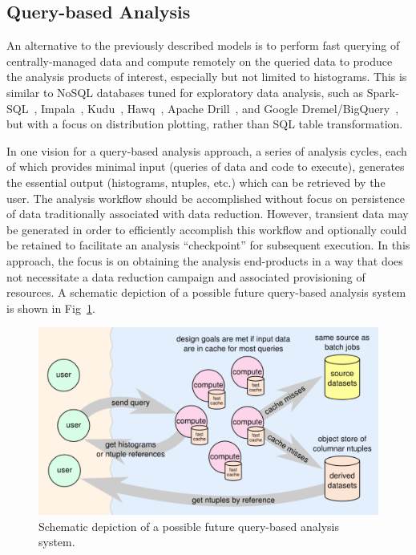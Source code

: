 \documentclass[12pt,a4paper]{article}
\begin{document}
\subsection{Query-based Analysis}

An alternative to the previously described models is to perform fast querying of  centrally-managed data and compute remotely on the queried data to produce the analysis products of interest, especially but not limited to histograms. This is similar to NoSQL databases tuned for exploratory data analysis, such as Spark-SQL~\cite{Armbrust:2015:SSR:2723372.2742797}, Impala~\cite{bittorf2015impala}, Kudu~\cite{t.lipcond.alvesd.burkertj.d.cryansa.dembom.percys.rusd.wangm.bertozzic.p.mccabea.wang.2015}, Hawq~\cite{Chang:2014:HMP:2588555.2595636}, Apache Drill~\cite{drill}, and Google Dremel/BigQuery~\cite{36632}, but with a focus on distribution plotting, rather than SQL table transformation.

In one vision for a query-based analysis approach, a series of analysis cycles, each of which provides minimal input (queries of data and code to execute), generates the essential output (histograms, ntuples, etc.) which can be retrieved by the user. The analysis workflow should be accomplished without focus on persistence of data traditionally associated with data reduction. However, transient data may be generated in order to efficiently accomplish this workflow and optionally could be retained to facilitate an analysis ``checkpoint'' for subsequent execution. In this approach, the focus is on obtaining the analysis end-products in a way that does not necessitate a data reduction campaign and associated provisioning of resources. A schematic depiction of a possible future query-based analysis system is shown in Fig~\ref{fig:query_system}.

\begin{figure}
\begin{center}
\includegraphics[width=\textwidth]{query_based_analysis_system.png}
\caption{\label{fig:query_system}Schematic depiction of a possible future query-based analysis system.}
\end{center}
\end{figure}
\end{document}
